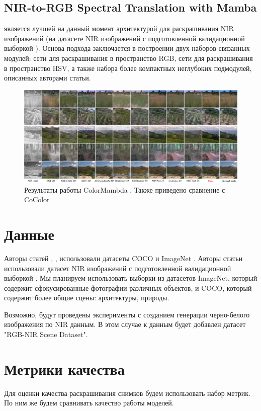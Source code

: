 \documentclass[14pt]{article}
\begin{document}
\subsection{NIR-to-RGB Spectral Translation with Mamba}
\cite{ColorMamba} является лучшей на данный момент архитектурой для раскрашивания NIR изображений (на датасете NIR изображений с подготовленной валидационной выборкой
\cite{VCIP_2020_NIR_dataset}). Основа подхода заключается в построении двух наборов связанных модулей: сети для раскрашивания в пространство RGB,
сети для раскрашивания в пространство HSV, а также набора более компактных неглубоких подмодулей, описанных авторами статьи.

\begin{figure}[H]
    \centering
    \includegraphics[width=1.05\textwidth]{resources/performance.pdf}
    \caption{Результаты работы ColorMambda \cite{ColorMamba}. Также приведено сравнение с CoColor \cite{CoColor}}
    \label{fig:id_figura}
\end{figure}


\section{Данные}
Авторы статей \cite{GuidedImageColorization}, \cite{InstaColor}, \cite{CoColor} использовали датасеты COCO \cite{COCO} и ImageNet \cite{ImageNet}.
Авторы статьи \cite{ColorMamba} использовали датасет NIR изображений с подготовленной валидационной выборкой \cite{VCIP_2020_NIR_dataset}.
Мы планируем использовать выборки из датасетов ImageNet, который содержит сфокусированные фотографии различных объектов, и COCO, который
содержит более общие сцены: архитектуры, природы.

Возможно, будут проведены эксперименты с созданием генерации черно-белого изображения по NIR данным. В этом случае к данным будет добавлен датасет
"RGB-NIR Scene Dataset".


\section{Метрики качества}
Для оценки качества раскрашивания снимков будем использовать набор метрик. По ним же будем сравнивать качество работы моделей.
\end{document}
